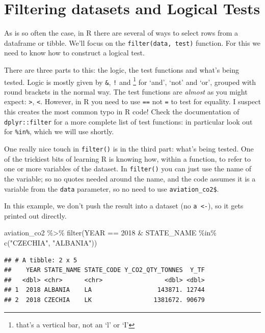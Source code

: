 \documentclass[
]{book}
\newenvironment{Shaded}{\begin{snugshade}}{\end{snugshade}}
\newcommand{\DecValTok}[1]{\textcolor[rgb]{0.00,0.00,0.81}{#1}}
\newcommand{\FunctionTok}[1]{\textcolor[rgb]{0.00,0.00,0.00}{#1}}
\newcommand{\NormalTok}[1]{#1}
\newcommand{\SpecialCharTok}[1]{\textcolor[rgb]{0.00,0.00,0.00}{#1}}
\newcommand{\StringTok}[1]{\textcolor[rgb]{0.31,0.60,0.02}{#1}}
\begin{document}
\hypertarget{filtering-datasets-and-logical-tests}{%
\section{Filtering datasets and Logical Tests}\label{filtering-datasets-and-logical-tests}}

As is so often the case, in R there are several of ways to select rows from a dataframe or tibble. We'll focus on the \texttt{filter(data,\ test)} function. For this we need to know how to construct a logical test.

There are three parts to this: the logic, the test functions and what's being tested. Logic is mostly given by \texttt{\&}, \texttt{!} and \texttt{\textbar{}}\footnote{that's a vertical bar, not an `l' or `I'} for `and', `not' and `or', grouped with round brackets in the normal way. The test functions are \emph{almost} as you might expect: \texttt{\textgreater{}}, \texttt{\textless{}}. However, in R you need to use \texttt{==} not \texttt{=} to test for equality. I suspect this creates the most common typo in R code! Check the documentation of \texttt{dplyr::filter} for a more complete list of test functions: in particular look out for \texttt{\%in\%}, which we will use shortly.

One really nice touch in \texttt{filter()} is in the third part: what's being tested. One of the trickiest bits of learning R is knowing how, within a function, to refer to one or more variables of the dataset. In \texttt{filter()} you can just use the name of the variable; so no quotes needed around the name, and the code assumes it is a variable from the \texttt{data} parameter, so no need to use \texttt{aviation\_co2\$}.

In this example, we don't push the result into a dataset (no \texttt{a\ \textless{}-}), so it gets printed out directly.

\begin{Shaded}
\begin{Highlighting}[]
\NormalTok{aviation\_co2 }\SpecialCharTok{\%\textgreater{}\%} 
  \FunctionTok{filter}\NormalTok{(YEAR }\SpecialCharTok{==} \DecValTok{2018} \SpecialCharTok{\&}\NormalTok{ STATE\_NAME }\SpecialCharTok{\%in\%} \FunctionTok{c}\NormalTok{(}\StringTok{"CZECHIA"}\NormalTok{, }\StringTok{"ALBANIA"}\NormalTok{))}
\end{Highlighting}
\end{Shaded}

\begin{verbatim}
## # A tibble: 2 x 5
##    YEAR STATE_NAME STATE_CODE Y_CO2_QTY_TONNES  Y_TF
##   <dbl> <chr>      <chr>                 <dbl> <dbl>
## 1  2018 ALBANIA    LA                  143871. 12744
## 2  2018 CZECHIA    LK                 1381672. 90679
\end{verbatim}
\end{document}
